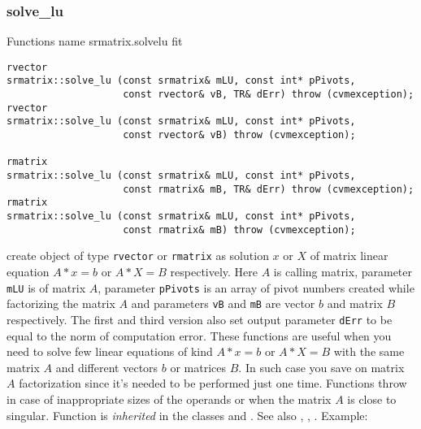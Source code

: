 \subsubsection{solve\_lu}
Functions%
\pdfdest name {srmatrix.solvelu} fit
\begin{verbatim}
rvector
srmatrix::solve_lu (const srmatrix& mLU, const int* pPivots,
                    const rvector& vB, TR& dErr) throw (cvmexception);
rvector
srmatrix::solve_lu (const srmatrix& mLU, const int* pPivots,
                    const rvector& vB) throw (cvmexception);

rmatrix
srmatrix::solve_lu (const srmatrix& mLU, const int* pPivots,
                    const rmatrix& mB, TR& dErr) throw (cvmexception);
rmatrix
srmatrix::solve_lu (const srmatrix& mLU, const int* pPivots,
                    const rmatrix& mB) throw (cvmexception);
\end{verbatim}
create  object of type \verb"rvector" or \verb"rmatrix" as
 solution $x$ or $X$ of matrix linear equation
$A*x=b$ or $A*X=B$ respectively. Here $A$ is  calling
matrix, 
parameter \verb"mLU" is 
of  matrix $A$, parameter \verb"pPivots" is an array of pivot numbers
created while factorizing the matrix $A$
and parameters \verb"vB" and \verb"mB" are  vector $b$ and
matrix $B$ respectively.
The first and third version also set output parameter \verb"dErr" to be equal
to the norm of computation error.
These functions are useful when you need to solve few linear equations
of kind $A*x=b$ or $A*X=B$ with the same matrix $A$ and different vectors $b$ 
or matrices $B$.
In such case you save on matrix $A$ factorization since it's needed to be
performed just one time.
Functions throw 
in case of inappropriate sizes
of the operands or when the matrix $A$ is close to singular.
Function is \emph{inherited} in the classes
and .
See also
,
,
.
Example:
